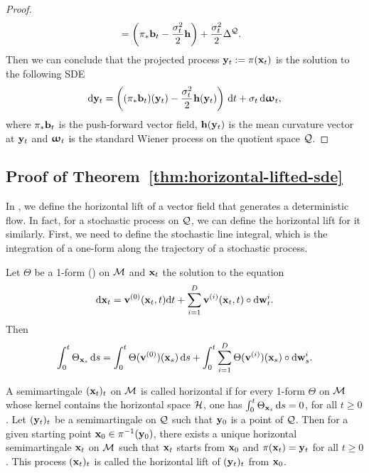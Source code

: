 \begin{proof}
\begin{align}
        &=\left(\pi_*\mathbf{b}_t-\frac{\sigma^2_t}{2}\mathbf{h}\right)+\frac{\sigma_t^2}{2}\Delta^{\mathcal{Q}}.
        \label{eqn:L-in-Q}
    \end{align}
    Then we can conclude that the projected process $\mathbf{y}_t:=\pi(\mathbf{x}_t)$ is the solution to the following SDE
      \begin{align}
        \mathrm{d}\mathbf{y}_t = \left( (\pi_*\mathbf{b}_t)(\mathbf{y}_t) - \frac{\sigma_t^2}{2} \mathbf{h}(\mathbf{y}_t) \right) \,\mathrm{d} t + \sigma_t \,\mathrm{d} {\bm{\upomega}}_t,
      \end{align}
      where $\pi_*\mathbf{b}_t$ is the push-forward vector field, $\mathbf{h}(\mathbf{y}_t)$ is the mean curvature vector at $\mathbf{y}_t$ and ${\bm{\upomega}}_t$ is the standard Wiener process on the quotient space $\mathcal{Q}$.
\end{proof}

\subsection{Proof of Theorem~\ref{thm:horizontal-lifted-sde}}\label{appx:proof-thm2}
In , we define the horizontal lift of a vector field that generates a deterministic flow. In fact, for a stochastic process on $\mathcal{Q}$, we can define the horizontal lift for it similarly. First, we need to define the stochastic line integral, which is the integration of a one-form along the trajectory of a stochastic process.
\begin{definition}
    \citep[Prop.~2.4.2]{hsu2002stochastic} Let $\Theta$ be a 1-form () on $\mathcal{M}$ and $\mathbf{x}_t$ the solution to the equation 
    \begin{align}
        \mathrm{d}\mathbf{x}_t=\mathbf{v}^{(0)}(\mathbf{x}_t,t)\mathrm{d} t+\sum_{i=1}^D\mathbf{v}^{(i)}(\mathbf{x}_t,t)\circ\mathrm{d} \mathbf{w}_t^i.
    \end{align}
    Then 
    \begin{align}
        \int_0^t \Theta_{\mathbf{x}_s} \,\mathrm{d} s = \int_0^t \Theta(\mathbf{v}^{(0)})(\mathbf{x}_s) \,\mathrm{d} s + \int_0^t\sum_{i=1}^D\Theta(\mathbf{v}^{(i)})(\mathbf{x}_s)\circ\mathrm{d} \mathbf{w}_s^i.
    \end{align}
\end{definition}
\begin{definition}\label{def:sto-horizontal-lift}
    \citep[Def.~3.1.9]{baudoin2024stochastic} A semimartingale $(\mathbf{x}_t)_t$ on $\mathcal{M}$ is called horizontal if for every 1-form $\Theta$ on $\mathcal{M}$ whose kernel contains the horizontal space $\mathcal{H}$, one has $%
    \int_0^t \Theta_{\bfxx_s} \ud s
    =0$, for all $t\ge0$. Let $(\mathbf{y}_t)_t$ be a semimartingale on $\mathcal{Q}$ such that $\mathbf{y}_0$ is a point of $\mathcal{Q}$. Then for a given starting point $\mathbf{x}_0\in\pi^{-1}(\mathbf{y}_0)$, there exists a unique horizontal semimartingale $\mathbf{x}_t$ on $\mathcal{M}$ such that $\mathbf{x}_t$ starts from $\mathbf{x}_0$ and $\pi(\mathbf{x}_t)=\mathbf{y}_t$ for all $t\ge0$.
    This process $(\mathbf{x}_t)_t$ is called the horizontal lift of $(\mathbf{y}_t)_t$ from $\mathbf{x}_0$.
\end{definition}

